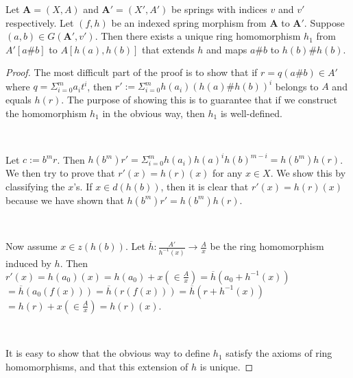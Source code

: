 \begin{proposition}\label{hext}
  Let $\boldsymbol{A}=(X,A)$ and $\boldsymbol{A'}=(X',A')$ be springs with indices $v$ and $v'$
  respectively. Let $(f,h)$ be an indexed spring morphism from $\boldsymbol{A}$ to
  $\boldsymbol{A'}$. Suppose $(a,b)\in{G}(\boldsymbol{A'},v')$. Then there exists a unique ring
  homomorphism $h_1$ from $A'[a{\#}b]$ to $A[h(a),h(b)]$ that extends $h$ and maps $a{\#}b$ to
  $h(b){\#}h(b)$.
\end{proposition}
\begin{proof}
  The most difficult part of the proof is to show that if $r=q(a{\#}b)\in{A'}$ where
  $q=\Sigma_{i=0}^m{a_i}t^i$, then $r':=\Sigma_{i=0}^m{h(a_i)}(h(a){\#}h(b))^i$ belongs to $A$ and
  equals $h(r)$. The purpose of showing this is to guarantee that if we construct the homomorphism
  $h_1$ in the obvious way, then $h_1$ is well-defined.

  \

  Let $c:=b^m{r}$. Then $h(b^m)r'=\Sigma_{i=0}^m{h(a_i)}h(a)^i{h(b)^{m-i}}=h(b^m)h(r)$. We then try
  to prove that $r'(x)=h(r)(x)$ for any $x\in{X}$. We show this by classifying the $x$'s. If
  $x\in{d(h(b))}$, then it is clear that $r'(x)=h(r)(x)$ because we have shown that
  $h(b^m)r'=h(b^m)h(r)$.

  \

  Now assume $x\in{z(h(b))}$. Let $\overline{h}:\frac{A'}{h^{-1}(x)}\rightarrow\frac{A}{x}$ be the
  ring homomorphism induced by $h$. Then
  \\
  $r'(x)=h(a_0)(x)=h(a_0)+x(\in\frac{A}{x})=\overline{h}(a_0+h^{-1}(x))$
  \\
  $=\overline{h}(a_0(f(x)))=\overline{h}(r(f(x)))=\overline{h}(r+h^{-1}(x))$
  \\
  $=h(r)+x(\in\frac{A}{x})=h(r)(x)$.

  \

  It is easy to show that the obvious way to define $h_1$ satisfy the axioms of ring homomorphisms,
  and that this extension of $h$ is unique.
\end{proof}


